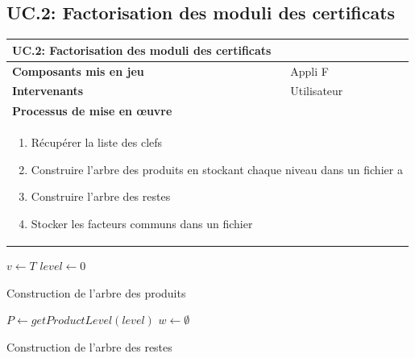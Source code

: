 \documentclass[a4paper,11pt,french]{article}
\begin{document}
\subsection{UC.2: Factorisation des moduli des certificats}
\begin{center}
	\vspace*{0.7cm}
	\begin{tabularx}{16cm}{|l|X|}
	\hline
	\multicolumn{2}{|l|}{\textbf{UC.2: Factorisation des moduli des certificats}}\\
	\hline
	\textbf{Composants mis en jeu} & Appli F\\
	\hline
	\textbf{Intervenants} & Utilisateur\\
	\hline
	\multicolumn{2}{|l|}{\textbf{Processus de mise en \oe uvre}}\\
	\hline
	\multicolumn{2}{|p{15cm}|}{
	\begin{enumerate}
	\item Récupérer la liste des clefs
	\item Construire l'arbre des produits en stockant chaque niveau dans un fichier  a
	\item Construire l'arbre des restes
	\item Stocker les facteurs communs dans un fichier
	\end{enumerate}
	}\\
	\hline
	\end{tabularx}
\end{center}
\begin{algorithm}[H]

 $v \leftarrow T$\;
 $level \leftarrow 0$\;
 \caption{Construction de l'arbre des produits}
\end{algorithm}
\vspace{1cm}
\begin{algorithm}[H]

 $P \leftarrow getProductLevel(level)$\;
 $w \leftarrow \emptyset$\;
 \caption{Construction de l'arbre des restes}
\end{algorithm}
\end{document}
